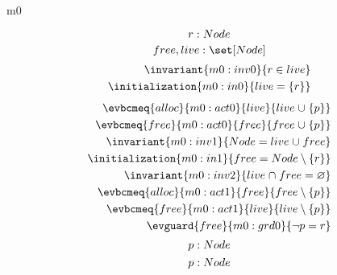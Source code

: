 \documentclass[12pt]{amsart}
\title{}
\author{}
\date{} %
\begin{document}
	
\begin{machine}{m0}
	
	\[ \constant{ r : Node } \]
	\[ \variable{ free,live: \set[Node] } \]
\begin{align}
	\invariant{m0:inv0}{r \in live} \\
	\initialization{m0:in0}{ live = \{ r\} }
\end{align}
\begin{align}
	\evbcmeq{alloc}{m0:act0}{live}{ live \bunion \{ p \} } \\
	\evbcmeq{free}{m0:act0}{free}{ free \bunion \{ p \} } \\
	\invariant{m0:inv1}{ Node = live \bunion free } \\
	\initialization{m0:in1}{ free = Node \setminus \{r\} } \\
	\invariant{m0:inv2}{ live \binter free = \emptyset } \\
	\evbcmeq{alloc}{m0:act1}{free}{ free \setminus \{ p \} } \\
	\evbcmeq{free}{m0:act1}{live}{ live \setminus \{ p \} } \\
	\evguard{free}{m0:grd0}{ \neg p = r }
\end{align}
	\[ \param{alloc}{p : Node} \]
	\[ \indices{free}{p : Node} \]
\end{machine}
\end{document}
